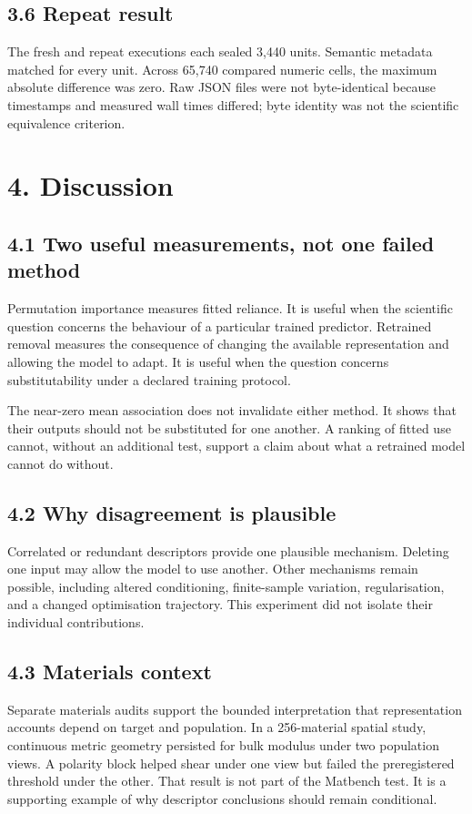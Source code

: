 \documentclass[10pt,a4paper]{article}
\begin{document}
\subsection{3.6 Repeat result}
The fresh and repeat executions each sealed 3,440 units. Semantic metadata matched for every unit. Across 65,740 compared numeric cells, the maximum absolute difference was zero. Raw JSON files were not byte-identical because timestamps and measured wall times differed; byte identity was not the scientific equivalence criterion.

\section{4. Discussion}
\subsection{4.1 Two useful measurements, not one failed method}
Permutation importance measures fitted reliance. It is useful when the scientific question concerns the behaviour of a particular trained predictor. Retrained removal measures the consequence of changing the available representation and allowing the model to adapt. It is useful when the question concerns substitutability under a declared training protocol.

The near-zero mean association does not invalidate either method. It shows that their outputs should not be substituted for one another. A ranking of fitted use cannot, without an additional test, support a claim about what a retrained model cannot do without.

\subsection{4.2 Why disagreement is plausible}
Correlated or redundant descriptors provide one plausible mechanism. Deleting one input may allow the model to use another. Other mechanisms remain possible, including altered conditioning, finite-sample variation, regularisation, and a changed optimisation trajectory. This experiment did not isolate their individual contributions.

\subsection{4.3 Materials context}
Separate materials audits support the bounded interpretation that representation accounts depend on target and population. In a 256-material spatial study, continuous metric geometry persisted for bulk modulus under two population views. A polarity block helped shear under one view but failed the preregistered threshold under the other. That result is not part of the Matbench test. It is a supporting example of why descriptor conclusions should remain conditional.
\end{document}
